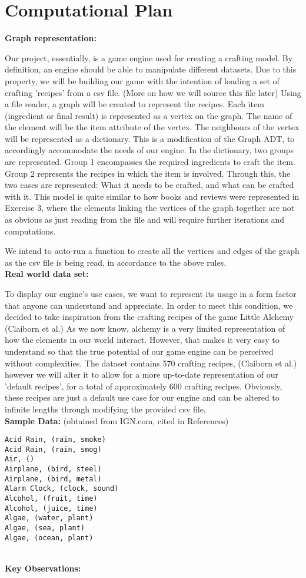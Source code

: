\documentclass[fontsize=11pt]{article}
\begin{document}
\section*{Computational Plan}

\textbf{\large{Graph representation:}}
\normalsize

Our project, essentially, is a game engine used for creating a crafting model. By definition, an engine should be able to manipulate different datasets. Due to this property, we will be building our game with the intention of loading a set of crafting 'recipes' from a csv file. (More on how we will source this file later)
Using a file reader, a graph will be created to represent the recipes. Each item (ingredient or final result) is represented as a vertex on the graph. The name of the element will be the item attribute of the vertex. The neighbours of the vertex will be represented as a dictionary. This is a modification of the Graph ADT, to accordingly accommodate the needs of our engine. In the dictionary, two groups are represented. Group 1 encompasses the required ingredients to craft the item. Group 2 represents the recipes in which the item is involved. Through this, the two cases are represented: What it needs to be crafted, and what can be crafted with it.
This model is quite similar to how books and reviews were represented in Exercise 3, where the elements linking the vertices of the graph together are not as obvious as just reading from the file and will require further iterations and computations.

We intend to auto-run a function to create all the vertices and edges of the graph as the csv file is being read, in accordance to the above rules. 
\\[23pt]
\textbf{\large{Real world data set:}}

\normalsize
To display our engine's use cases, we want to represent its usage in a form factor that anyone can understand and appreciate. In order to meet this condition, we decided to take inspiration from the crafting recipes of the game Little Alchemy (Claiborn et al.) As we now know, alchemy is a very limited representation of how the elements in our world interact. However, that makes it very easy to understand so that the true potential of our game engine can be perceived without complexities. The dataset contains 570 crafting recipes, (Claiborn et al.) however we will alter it to allow for a more up-to-date representation of our 'default recipes', for a total of approximately 600 crafting recipes. Obviously, these recipes are just a default use case for our engine and can be altered to infinite lengths through modifying the provided csv file.
\\[3pt]
\textbf{Sample Data:} (obtained from IGN.com, cited in References)
\begin{verbatim}
Acid Rain, (rain, smoke)
Acid Rain, (rain, smog)
Air, ()
Airplane, (bird, steel)
Airplane, (bird, metal)
Alarm Clock, (clock, sound)
Alcohol, (fruit, time) 
Alcohol, (juice, time)
Algae, (water, plant)
Algae, (sea, plant)
Algae, (ocean, plant)
\end{verbatim}
\\[3pt]
\textbf{Key Observations:}
\end{document}
